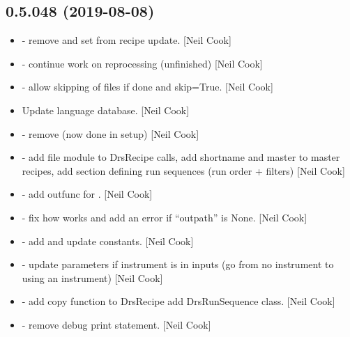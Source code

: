 \documentclass[a4paper,10pt,english]{report}
\begin{document}
\subsection{0.5.048 (2019-08-08)}
\label{\detokenize{misc/changelog:id95}}\begin{itemize}
\item {} 
 - remove  and set  from
recipe update. {[}Neil Cook{]}

\item {} 
 - continue work on reprocessing
(unfinished) {[}Neil Cook{]}

\item {} 
 - allow skipping of files if done and
\textendash{}skip=True. {[}Neil Cook{]}

\item {} 
Update language database. {[}Neil Cook{]}

\item {} 
 - remove  (now done in setup) {[}Neil
Cook{]}

\item {} 
 - add file module to
DrsRecipe calls, add shortname and master to master recipes, add
section defining run sequences (run order + filters) {[}Neil Cook{]}

\item {} 
 - add outfunc for . {[}Neil Cook{]}

\item {} 
 - fix how 
works and add an error if “outpath” is None. {[}Neil Cook{]}

\item {} 
 - add and update constants.
{[}Neil Cook{]}

\item {} 
 - update parameters if instrument is in inputs (go from
no instrument to using an instrument) {[}Neil Cook{]}

\item {} 
 - add copy function to DrsRecipe add DrsRunSequence
class. {[}Neil Cook{]}

\item {} 
 - remove debug print statement. {[}Neil Cook{]}

\end{itemize}
\end{document}
